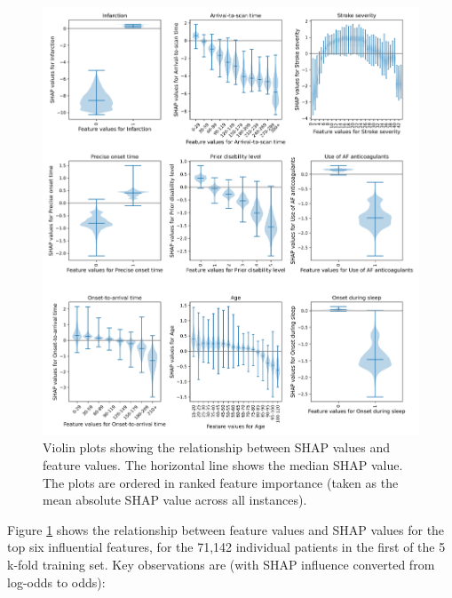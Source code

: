 \begin{figure}[!h]
\centering
\includegraphics[width=1\textwidth]{./images/03d_xgb_10_features_thrombolysis_shap_violin_all_features}
\caption{Violin plots showing the relationship between SHAP values and feature values. The horizontal line shows the median SHAP value. The plots are ordered in ranked feature importance (taken as the mean absolute SHAP value across all instances).}
\label{fig:results_shap_violin}
\end{figure}

\iffalse
Figure \ref{fig:results_shap_violin} shows the relationship between feature values and SHAP values for the top six influential features, for the 71,142 individual patients in the first of the 5 k-fold training set. Key observations are (with SHAP influence converted from log-odds to odds):

